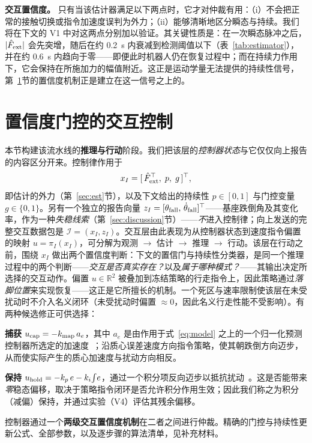 \documentclass[journal]{IEEEtran}
\begin{document}
\textbf{交互置信度。} 只有当该估计器满足以下两点时，它才对仲裁有用：（i）不会把正常的接触切换或指令加速度误判为外力；（ii）能够清晰地区分瞬态与持续。我们将在下文的 V1 中对这两点分别加以验证。其关键性质是：在一次瞬态脉冲之后，$|\hat F_{\rm ext}|$ 会先突增，随后在约 0.2~s 内衰减到检测阈值以下（表~\ref{tab:estimator}），并在约 0.6~s 内趋向于零——即便此时机器人仍在恢复过程中；而在持续力作用下，它会保持在所施加力的幅值附近。这正是运动学量无法提供的持续性信号，第~\ref{sec:control}节的置信度机制正是建立在这一信号之上的。

\section{置信度门控的交互控制}
\label{sec:control}

本节构建该流水线的\textbf{推理与行动}阶段。我们把该层的\emph{控制器状态}与它仅仅向上报告的内容区分开来。控制律作用于
\begin{equation}
x_I=[\,\hat F_{\rm ext}^\top,\; p,\; g\,]^\top,
\label{eq:istate}
\end{equation}
即估计的外力（第~\ref{sec:est}节），以及下文给出的持续性 $p\in[0,1]$ 与门控变量 $g\in\{0,1\}$。另有一个独立的报告向量 $z_I=[\theta_{\rm fall},\,\dot\theta_{\rm fall}]^\top$——基座跌倒角及其变化率，作为一种\emph{失稳线索}（第~\ref{sec:discussion}节）——\emph{不}进入控制律；向上发送的完整交互数据包是 $\mathcal I=(x_I,z_I)$。交互层由此表现为从控制器状态到速度指令偏置的映射 $u=\pi_I(x_I)$，可分解为观测 $\to$ 估计 $\to$ 推理 $\to$ 行动。该层在行动之前，围绕 $x_I$ 做出两个置信度判断：下文的置信门与持续性分类器，是同一个推理过程中的两个判断——\emph{交互是否真实存在？}以及\emph{属于哪种模式？}——其输出决定所选择的交互动作。偏置 $u\in\mathbb{R}^2$ 被叠加到冻结策略的行走指令上，因此策略通过\emph{落脚位置}来实现恢复——这正是它所擅长的机制。一个死区与速率限制使该层在未受扰动时不介入名义闭环（未受扰动时偏置 $\approx 0$，因此名义行走性能不受影响）。有两种候选修正可供选择：

\textbf{捕获} $u_{\rm cap}=-k_{\rm map}\,a_e$，其中 $a_e$ 是由作用于式~\eqref{eq:model} 之上的一个归一化预测控制器所选定的加速度~\cite{r1}；沿质心误差速度方向指令策略，使其朝跌倒方向迈步，从而使实际产生的质心加速度与扰动方向相反。

\textbf{保持} $u_{\rm hold}=-k_p\,e-k_i\!\int\! e$，通过一个积分项反向迈步以抵抗扰动~\cite{r19}。这是否能带来\emph{零}稳态偏移，取决于策略指令闭环是否允许积分作用生效；因此我们称之为积分（减偏）保持，并通过实验（V4）评估其残余偏移。

控制器通过一个\textbf{两级交互置信度机制}在二者之间进行仲裁。精确的门控与持续性更新公式、全部参数，以及逐步骤的算法清单，见补充材料。
\end{document}
